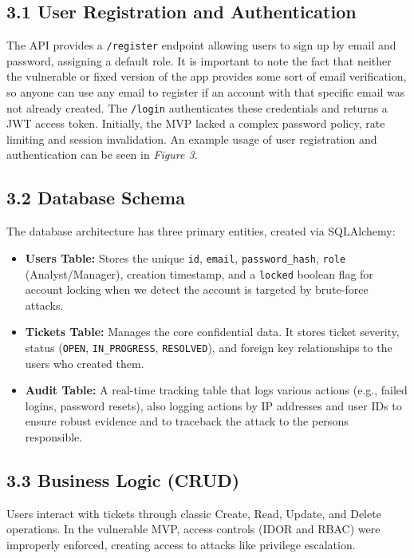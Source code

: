 \documentclass[11pt]{article}
\begin{document}
\subsection*{3.1 User Registration and Authentication}

The API provides a \texttt{/register} endpoint allowing users to sign up by email and password, assigning a default role. It is important to note the fact that neither the vulnerable or fixed version of the app provides some sort of email verification, so anyone can use any email to register if an account with that specific email was not already created. The \texttt{/login} authenticates these credentials and returns a JWT access token. Initially, the MVP lacked a complex password policy, rate limiting and session invalidation. An example usage of user registration and authentication can be seen in \textit{Figure 3}.

\subsection*{3.2 Database Schema}

The database architecture has three primary entities, created via SQLAlchemy:
\begin{itemize}
    \item \textbf{Users Table:} Stores the unique \texttt{id}, \texttt{email}, \texttt{password\_hash}, \texttt{role} (Analyst/Manager), creation timestamp, and a \texttt{locked} boolean flag for account locking when we detect the account is targeted by brute-force attacks.
    \item \textbf{Tickets Table:} Manages the core confidential data. It stores ticket severity, status (\texttt{OPEN}, \texttt{IN\_PROGRESS}, \texttt{RESOLVED}), and foreign key relationships to the users who created them.
    \item \textbf{Audit Table:} A real-time tracking table that logs various actions (e.g., failed logins, password resets), also logging actions by IP addresses and user IDs to ensure robust evidence and to traceback the attack to the persons responsible.
\end{itemize}

\subsection*{3.3 Business Logic (CRUD)}

Users interact with tickets through classic Create, Read, Update, and Delete operations. In the vulnerable MVP, access controls (IDOR and RBAC) were improperly enforced, creating access to attacks like privilege escalation.
\end{document}
